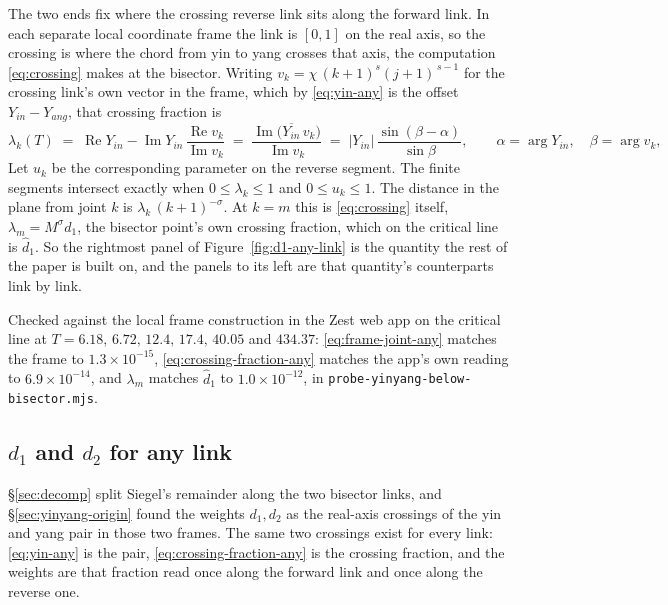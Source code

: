 \documentclass[11pt]{article}
\theoremstyle{definition}
\begin{document}
The two ends fix where the crossing reverse link sits along the forward link. In each separate local coordinate frame the link
is $[0,1]$ on the real axis, so the crossing is where the chord from yin to
yang crosses that axis, the computation \eqref{eq:crossing} makes at the bisector.
Writing $v_k=\chi\,(k+1)^{s}(j+1)^{\,s-1}$ for the crossing link's own vector in
the frame, which by \eqref{eq:yin-any} is the offset $Y_{in}-Y_{ang}$, that
crossing fraction is
\begin{equation}\label{eq:crossing-fraction-any}
\lambda_k(T)
\;=\;\operatorname{Re}Y_{in}-\operatorname{Im}Y_{in}\,
\frac{\operatorname{Re}v_k}{\operatorname{Im}v_k}
\;=\;\frac{\operatorname{Im}\bigl(\overline{Y_{in}}\,v_k\bigr)}{\operatorname{Im}v_k}
\;=\;\bigl|Y_{in}\bigr|\,\frac{\sin(\beta-\alpha)}{\sin\beta},
\qquad
\alpha=\arg Y_{in},\quad \beta=\arg v_k,
\end{equation}
Let $u_k$ be the corresponding parameter on the reverse segment. The finite
segments intersect exactly when $0\leq\lambda_k\leq1$ and $0\leq u_k\leq1$.
The distance in the plane from joint $k$ is $\lambda_k\,(k+1)^{-\sigma}$. At
$k=m$ this is \eqref{eq:crossing} itself, $\lambda_m=M^{\sigma}d_1$,
the bisector point's own crossing fraction, which on the critical line is
$\hat d_1$. So the rightmost panel of Figure~\ref{fig:d1-any-link} is the
quantity the rest of the paper is built on, and the panels to its left are that
quantity's counterparts link by link.

Checked against the local frame construction in the Zest web app on the critical
line at $T=6.18,\,6.72,\,12.4,\,17.4,\,40.05$ and $434.37$:
\eqref{eq:frame-joint-any} matches the frame to $1.3\times10^{-15}$,
\eqref{eq:crossing-fraction-any} matches the app's own reading to
$6.9\times10^{-14}$, and $\lambda_m$ matches $\hat d_1$ to $1.0\times10^{-12}$,
in \texttt{probe-yinyang-below-bisector.mjs}.

\subsection{\texorpdfstring{$d_1$ and $d_2$}{d1 and d2} for any link}\label{sec:d1-any}

\S\ref{sec:decomp} split Siegel's remainder along the two bisector links,
and \S\ref{sec:yinyang-origin} found the weights
$d_1,d_2$ as the real-axis crossings of the yin and yang pair in those two
frames. The same two crossings exist for every link: \eqref{eq:yin-any} is
the pair, \eqref{eq:crossing-fraction-any} is the crossing fraction, and the
weights are that fraction read once along the forward link and once along the
reverse one.
\end{document}
